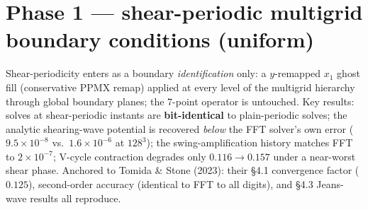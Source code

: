 \documentclass[11pt]{article}
\begin{document}
\section*{Phase 1 --- shear-periodic multigrid boundary conditions (uniform)}
Shear-periodicity enters as a boundary \emph{identification} only: a
$y$-remapped $x_1$ ghost fill (conservative PPMX remap) applied at every level
of the multigrid hierarchy through global boundary planes; the 7-point operator
is untouched. Key results: solves at shear-periodic instants are
\textbf{bit-identical} to plain-periodic solves; the analytic shearing-wave
potential is recovered \emph{below} the FFT solver's own error
($9.5\times10^{-8}$ vs.\ $1.6\times10^{-6}$ at $128^3$); the swing-amplification
history matches FFT to $2\times10^{-7}$; V-cycle contraction degrades only
$0.116 \to 0.157$ under a near-worst shear phase. Anchored to Tomida \& Stone
(2023): their \S4.1 convergence factor ($0.125$), second-order accuracy
(identical to FFT to all digits), and \S4.3 Jeans-wave results all reproduce.
\end{document}
